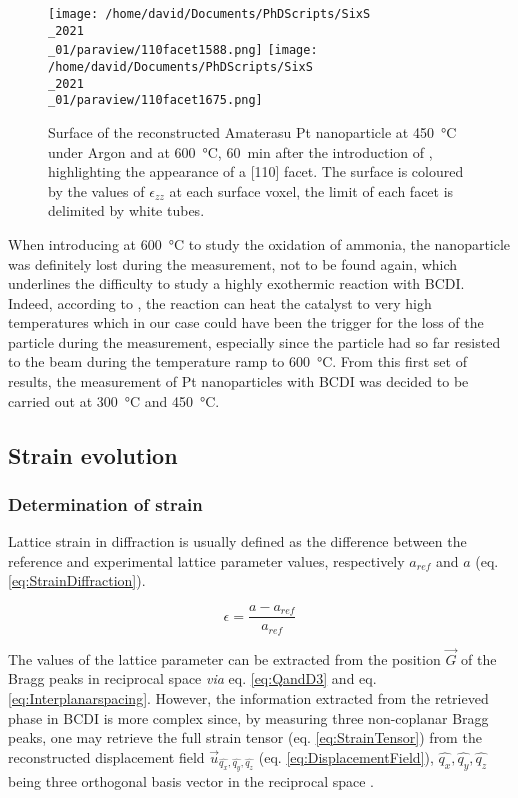\begin{figure}[!htb]
    \centering
    \texttt{[image: /home/david/Documents/PhDScripts/SixS\\\_2021\\\_01/paraview/110facet1588.png]}
    \texttt{[image: /home/david/Documents/PhDScripts/SixS\\\_2021\\\_01/paraview/110facet1675.png]}
    \caption{
        Surface of the reconstructed Amaterasu Pt nanoparticle at \qty{450}{\degreeCelsius} under Argon and at \qty{600}{\degreeCelsius}, \qty{60}{\minute} after the introduction of \ammonia, highlighting the appearance of a [110] facet.
        The surface is coloured by the values of $\epsilon_{zz}$ at each surface voxel, the limit of each facet is delimited by white tubes.
    }
    \label{fig:Amaterasu110}
\end{figure}

When introducing \dioxygen at \qty{600}{\degreeCelsius} to study the oxidation of ammonia, the nanoparticle was definitely lost during the measurement, not to be found again, which underlines the difficulty to study a highly exothermic reaction with BCDI.
Indeed, according to \cite{}, the reaction can heat the catalyst to very high temperatures which in our case could have been the trigger for the loss of the particle during the measurement, especially since the particle had so far resisted to the beam during the temperature ramp to \qty{600}{\degreeCelsius}.
From this first set of results, the measurement of Pt nanoparticles with BCDI was decided to be carried out at \qty{300}{\degreeCelsius} and \qty{450}{\degreeCelsius}.

\subsection{Strain evolution} \label{sec:StrainTempRamp}

\subsubsection{Determination of strain}

Lattice strain in diffraction is usually defined as the difference between the  reference and experimental lattice parameter values, respectively $a_{ref}$ and $a$ (eq. \ref{eq:StrainDiffraction}).

\begin{equation}
    \epsilon = \frac{a - a_{ref}}{a_{ref}}
    \label{eq:StrainDiffraction}
\end{equation}

The values of the lattice parameter can be extracted from the position $\vec{G}$ of the Bragg peaks in reciprocal space \textit{via} eq. \ref{eq:QandD3} and eq. \ref{eq:Interplanarspacing}.
However, the information extracted from the retrieved phase in BCDI is more complex since, by measuring three non-coplanar Bragg peaks, one may retrieve the full strain tensor (eq. \ref{eq:StrainTensor}) from the reconstructed displacement field $\vec{u}_{\hat{q_x}, \hat{q_y}, \hat{q_z}}$ (eq. \ref{eq:DisplacementField}), $\hat{q_x}, \hat{q_y}, \hat{q_z}$ being three orthogonal basis vector in the reciprocal space \parencite{Karpov2019}.

